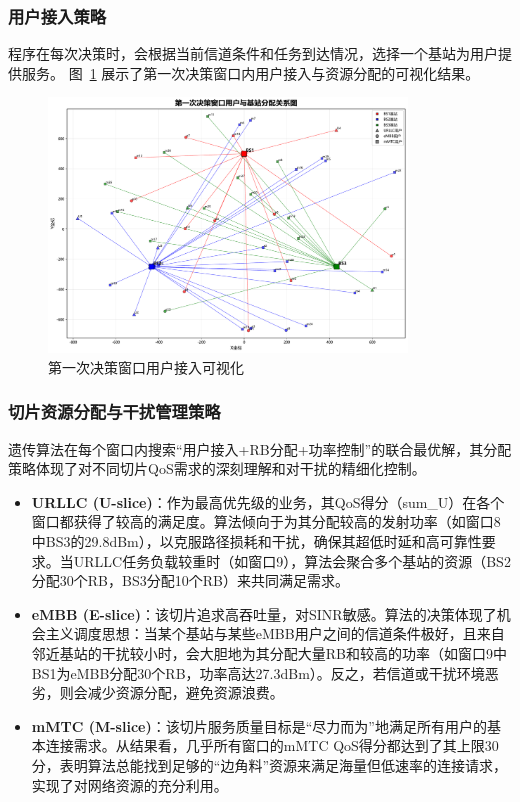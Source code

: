 \subsubsection{用户接入策略}
程序在每次决策时，会根据当前信道条件和任务到达情况，选择一个基站为用户提供服务。
图~\ref{fig:q3_first_window_vis} 展示了第一次决策窗口内用户接入与资源分配的可视化结果。
\begin{figure}[H]
    \centering
    \includegraphics[width=0.85\textwidth]{figures/第一次决策可视化.pdf}
    \caption{第一次决策窗口用户接入可视化}
    \label{fig:q3_first_window_vis}
\end{figure}

\subsubsection{切片资源分配与干扰管理策略}
遗传算法在每个窗口内搜索“用户接入+RB分配+功率控制”的联合最优解，其分配策略体现了对不同切片QoS需求的深刻理解和对干扰的精细化控制。
\begin{itemize}
    \item \textbf{URLLC (U-slice)}：作为最高优先级的业务，其QoS得分（sum\_U）在各个窗口都获得了较高的满足度。算法倾向于为其分配较高的发射功率（如窗口8中BS3的29.8dBm），以克服路径损耗和干扰，确保其超低时延和高可靠性要求。当URLLC任务负载较重时（如窗口9），算法会聚合多个基站的资源（BS2分配30个RB，BS3分配10个RB）来共同满足需求。
    \item \textbf{eMBB (E-slice)}：该切片追求高吞吐量，对SINR敏感。算法的决策体现了机会主义调度思想：当某个基站与某些eMBB用户之间的信道条件极好，且来自邻近基站的干扰较小时，会大胆地为其分配大量RB和较高的功率（如窗口9中BS1为eMBB分配30个RB，功率高达27.3dBm）。反之，若信道或干扰环境恶劣，则会减少资源分配，避免资源浪费。
    \item \textbf{mMTC (M-slice)}：该切片服务质量目标是“尽力而为”地满足所有用户的基本连接需求。从结果看，几乎所有窗口的mMTC QoS得分都达到了其上限30分，表明算法总能找到足够的“边角料”资源来满足海量但低速率的连接请求，实现了对网络资源的充分利用。
\end{itemize}





